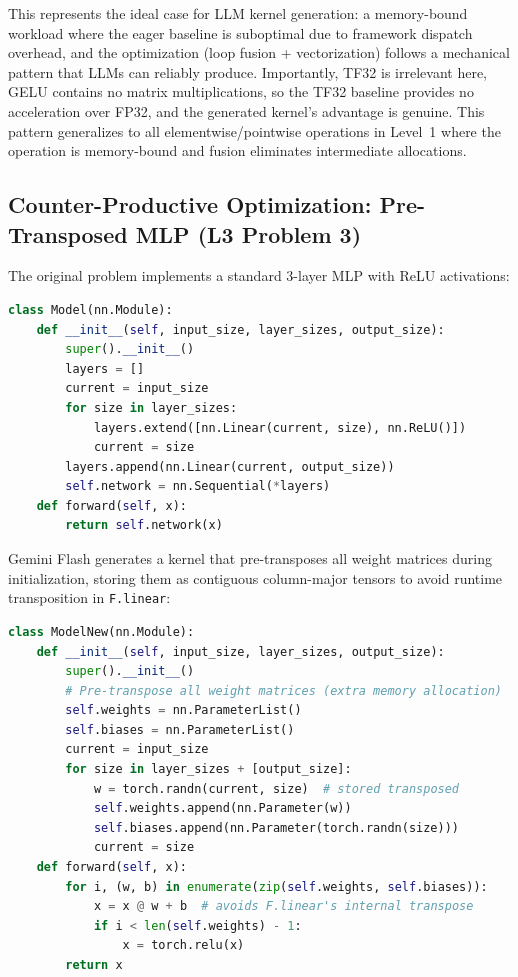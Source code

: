 \documentclass[11pt]{article}
\begin{document}
This represents the ideal case for LLM kernel generation: a memory-bound workload where the eager baseline is suboptimal due to framework dispatch overhead, and the optimization (loop fusion + vectorization) follows a mechanical pattern that LLMs can reliably produce. Importantly, TF32 is irrelevant here, GELU contains no matrix multiplications, so the TF32 baseline provides no acceleration over FP32, and the generated kernel's advantage is genuine. This pattern generalizes to all elementwise/pointwise operations in Level~1 where the operation is memory-bound and fusion eliminates intermediate allocations.

\subsection{Counter-Productive Optimization: Pre-Transposed MLP (L3 Problem 3)}\label{app:counter}

The original problem implements a standard 3-layer MLP with ReLU activations:
\begin{lstlisting}[language=Python,caption={Original Problem 3: A 3-layer MLP. Each \texttt{nn.Linear} call dispatches to cuBLAS internally.}]
class Model(nn.Module):
    def __init__(self, input_size, layer_sizes, output_size):
        super().__init__()
        layers = []
        current = input_size
        for size in layer_sizes:
            layers.extend([nn.Linear(current, size), nn.ReLU()])
            current = size
        layers.append(nn.Linear(current, output_size))
        self.network = nn.Sequential(*layers)
    def forward(self, x):
        return self.network(x)
\end{lstlisting}

Gemini Flash generates a kernel that pre-transposes all weight matrices during initialization, storing them as contiguous column-major tensors to avoid runtime transposition in \texttt{F.linear}:
\begin{lstlisting}[language=Python,caption={Gemini Flash's counter-productive optimization. Pre-transposes weights to avoid implicit transposition in \texttt{F.linear}, but cuBLAS already handles this efficiently on H200.}]
class ModelNew(nn.Module):
    def __init__(self, input_size, layer_sizes, output_size):
        super().__init__()
        # Pre-transpose all weight matrices (extra memory allocation)
        self.weights = nn.ParameterList()
        self.biases = nn.ParameterList()
        current = input_size
        for size in layer_sizes + [output_size]:
            w = torch.randn(current, size)  # stored transposed
            self.weights.append(nn.Parameter(w))
            self.biases.append(nn.Parameter(torch.randn(size)))
            current = size
    def forward(self, x):
        for i, (w, b) in enumerate(zip(self.weights, self.biases)):
            x = x @ w + b  # avoids F.linear's internal transpose
            if i < len(self.weights) - 1:
                x = torch.relu(x)
        return x
\end{lstlisting}
\end{document}

